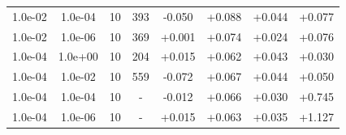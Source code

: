 \documentclass[11pt,a4paper]{article}
\begin{document}
\begin{table}[t]
{\begin{tabular}{*{8}c}
 1.0e-02 	 & 1.0e-04 	 & 10 & 393 	 & -0.050 & +0.088 & +0.044 & +0.077 \\ 
 1.0e-02 	 & 1.0e-06 	 & 10 & 369 	 & +0.001 & +0.074 & +0.024 & +0.076 \\ 
 1.0e-04 	 & 1.0e+00 	 & 10 & 204 	 & +0.015 & +0.062 & +0.043 & +0.030 \\ 
 1.0e-04 	 & 1.0e-02 	 & 10 & 559 	 & -0.072 & +0.067 & +0.044 & +0.050 \\ 
 1.0e-04 	 & 1.0e-04 	 & 10 & -	 & -0.012 & +0.066 & +0.030 & +0.745 \\ 
1.0e-04 	 & 1.0e-06 	 & 10 & -	 & +0.015 & +0.063 & +0.035 & +1.127 \\ 

\end{tabular}}
\end{table}
\end{document}

